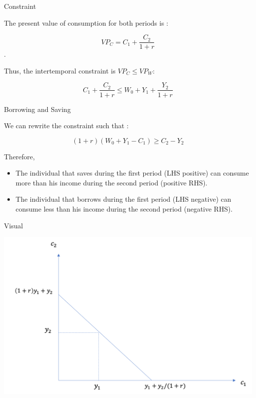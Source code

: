 \documentclass[handout]{beamer}
\begin{document}
\begin{frame}{Constraint}

The present value of consumption for both periods is : 

$$VP_C = C_1 + \frac{C_2}{1+r}$$. 

Thus, the intertemporal constraint is $ VP_C \leq VP_W $:

$$ C_1 + \frac{C_2}{1+r} \leq W_0 + Y_1 + \frac{Y_2}{1+r}  $$

\end{frame}

\begin{frame}{Borrowing and Saving}

We can rewrite the constraint such that :

$$ (1+r)(W_0 + Y_1 - C_1) \ge  C_2 - Y_2 $$

Therefore,

\begin{itemize}
\item The individual that saves during the first period (LHS positive) can consume more than his income during the second period (positive RHS).
\item The individual that borrows during the first period (LHS negative) can consume less than his income during the second period (negative RHS).
\end{itemize}

\end{frame}


\begin{frame}{Visual}

\includegraphics[scale=0.5]{budget.png}

\end{frame}
\end{document}
